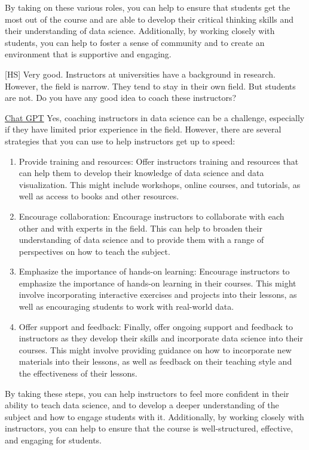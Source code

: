 \documentclass[
]{book}
\providecommand{\tightlist}{%
  \setlength{\itemsep}{0pt}\setlength{\parskip}{0pt}}
\theoremstyle{definition}
\theoremstyle{definition}
\theoremstyle{definition}
\theoremstyle{definition}
\theoremstyle{remark}
\begin{document}
By taking on these various roles, you can help to ensure that students get the most out of the course and are able to develop their critical thinking skills and their understanding of data science. Additionally, by working closely with students, you can help to foster a sense of community and to create an environment that is supportive and engaging.

{[}HS{]} Very good. Instructors at universities have a background in research. However, the field is narrow. They tend to stay in their own field. But students are not. Do you have any good idea to coach these instructors?

\protect\hyperlink{chatgpt}{Chat GPT} Yes, coaching instructors in data science can be a challenge, especially if they have limited prior experience in the field. However, there are several strategies that you can use to help instructors get up to speed:

\begin{enumerate}
\def\labelenumi{\arabic{enumi}.}
\tightlist
\item
  Provide training and resources: Offer instructors training and resources that can help them to develop their knowledge of data science and data visualization. This might include workshops, online courses, and tutorials, as well as access to books and other resources.
\item
  Encourage collaboration: Encourage instructors to collaborate with each other and with experts in the field. This can help to broaden their understanding of data science and to provide them with a range of perspectives on how to teach the subject.
\item
  Emphasize the importance of hands-on learning: Encourage instructors to emphasize the importance of hands-on learning in their courses. This might involve incorporating interactive exercises and projects into their lessons, as well as encouraging students to work with real-world data.
\item
  Offer support and feedback: Finally, offer ongoing support and feedback to instructors as they develop their skills and incorporate data science into their courses. This might involve providing guidance on how to incorporate new materials into their lessons, as well as feedback on their teaching style and the effectiveness of their lessons.
\end{enumerate}

By taking these steps, you can help instructors to feel more confident in their ability to teach data science, and to develop a deeper understanding of the subject and how to engage students with it. Additionally, by working closely with instructors, you can help to ensure that the course is well-structured, effective, and engaging for students.
\end{document}
